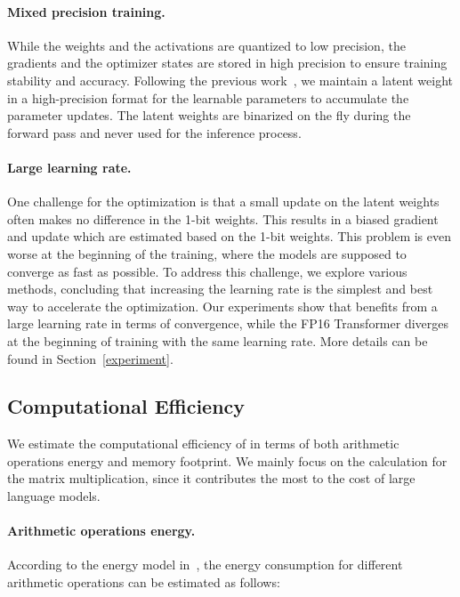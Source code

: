 \paragraph{Mixed precision training.} 

While the weights and the activations are quantized to low precision, the gradients and the optimizer states are stored in high precision to ensure training stability and accuracy. Following the previous work~\cite{adambnn}, we maintain a latent weight in a high-precision format for the learnable parameters to accumulate the parameter updates. The latent weights are binarized on the fly during the forward pass and never used for the inference process.

\paragraph{Large learning rate.} 

One challenge for the optimization is that a small update on the latent weights often makes no difference in the 1-bit weights. This results in a biased gradient and update which are estimated based on the 1-bit weights. This problem is even worse at the beginning of the training, where the models are supposed to converge as fast as possible. To address this challenge, we explore various methods, concluding that increasing the learning rate is the simplest and best way to accelerate the optimization. Our experiments show that \our{} benefits from a large learning rate in terms of convergence, while the FP16 Transformer diverges at the beginning of training with the same learning rate. More details can be found in Section~\ref{experiment}.

\subsection{Computational Efficiency}
\label{sec:compute}

We estimate the computational efficiency of \our{} in terms of both arithmetic operations energy and memory footprint. We mainly focus on the calculation for the matrix multiplication, since it contributes the most to the cost of large language models.

\paragraph{Arithmetic operations energy.}

According to the energy model in~\cite{energycost,pokebnn}, the energy consumption for different arithmetic operations can be estimated as follows:

